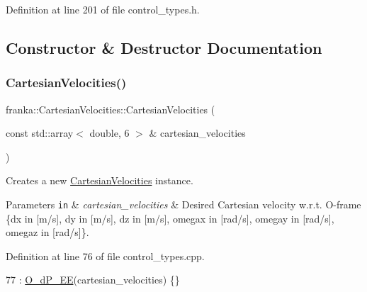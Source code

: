 Definition at line 201 of file control\+\_\+types.\+h.



\subsection{Constructor \& Destructor Documentation}
\mbox{\label{classfranka_1_1CartesianVelocities_a713380954e1f10c1be3033b95ca00657}} 
\subsubsection{\texorpdfstring{Cartesian\+Velocities()}{CartesianVelocities()}\hspace{0.1cm}{\footnotesize\ttfamily [1/4]}}
{\footnotesize\ttfamily franka\+::\+Cartesian\+Velocities\+::\+Cartesian\+Velocities (\begin{DoxyParamCaption}\item[{const std\+::array$<$ double, 6 $>$ \&}]{cartesian\+\_\+velocities }\end{DoxyParamCaption})\hspace{0.3cm}{\ttfamily [noexcept]}}

Creates a new \hyperlink{classfranka_1_1CartesianVelocities}{Cartesian\+Velocities} instance.


\begin{DoxyParams}[1]{Parameters}
\mbox{\tt in}  & {\em cartesian\+\_\+velocities} & Desired Cartesian velocity w.\+r.\+t. O-\/frame \{dx in \mbox{[}m/s\mbox{]}, dy in \mbox{[}m/s\mbox{]}, dz in \mbox{[}m/s\mbox{]}, omegax in \mbox{[}rad/s\mbox{]}, omegay in \mbox{[}rad/s\mbox{]}, omegaz in \mbox{[}rad/s\mbox{]}\}. \\
\hline
\end{DoxyParams}


Definition at line 76 of file control\+\_\+types.\+cpp.


\begin{DoxyCode}
77     : \hyperlink{classfranka_1_1CartesianVelocities_ab7a42c7c1ee7109025aff5c43a56b398}{O\_dP\_EE}(cartesian\_velocities) \{\}
\end{DoxyCode}
\mbox{\label{classfranka_1_1CartesianVelocities_a95f6feec3539ed9f96d555447717eb72}} 

